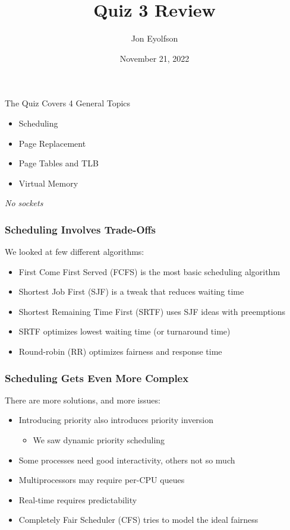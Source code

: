 

\title{Quiz 3 Review}
\author{Jon Eyolfson}
\date{November 21, 2022}


  \begin{frame}
    \titlepage
  \end{frame}

  \begin{frame}{The Quiz Covers 4 General Topics}

    \begin{itemize}
      \item Scheduling
      \item Page Replacement
      \item Page Tables and TLB
      \item Virtual Memory
    \end{itemize}

    \vspace{2em}

    \textit{No sockets}
  \end{frame}

  \begin{frame}
    \frametitle{Scheduling Involves Trade-Offs}

    We looked at few different algorithms:
    \begin{itemize}
      \item First Come First Served (FCFS) is the most basic scheduling algorithm
      \item Shortest Job First (SJF) is a tweak that reduces waiting time
      \item Shortest Remaining Time First (SRTF) uses SJF ideas with preemptions
      \item SRTF optimizes lowest waiting time (or turnaround time)
      \item Round-robin (RR) optimizes fairness and response time
    \end{itemize}
  \end{frame}
  
  \begin{frame}
    \frametitle{Scheduling Gets Even More Complex}

    There are more solutions, and more issues:
    \begin{itemize}
      \item Introducing priority also introduces priority inversion
      \begin{itemize}
        \item We saw dynamic priority scheduling
      \end{itemize}
      \item Some processes need good interactivity, others not so much
      \item Multiprocessors may require per-CPU queues
      \item Real-time requires predictability
      \item Completely Fair Scheduler (CFS) tries to model the ideal fairness
    \end{itemize}
  \end{frame}

